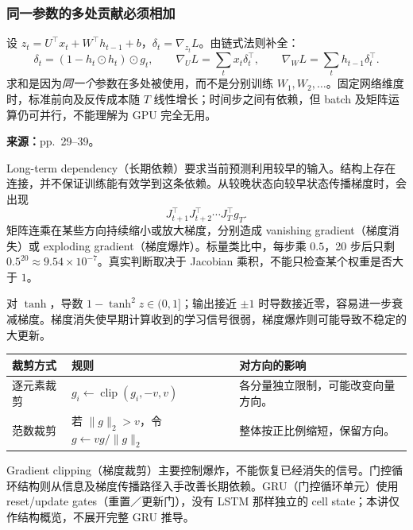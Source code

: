 \subsubsection{同一参数的多处贡献必须相加}

设 $z_t=U^\top x_t+W^\top h_{t-1}+b$，$\delta_t=\nabla_{z_t}L$。由链式法则补全：
\[
 \delta_t=(1-h_t\odot h_t)\odot g_t,\qquad
 \nabla_U L=\sum_t x_t\delta_t^\top,\qquad
 \nabla_W L=\sum_t h_{t-1}\delta_t^\top.
\]
求和是因为\emph{同一个}参数在多处被使用，而不是分别训练 $W_1,W_2,\ldots$。固定网络维度时，标准前向及反传成本随 $T$ 线性增长；时间步之间有依赖，但 batch 及矩阵运算仍可并行，不能理解为 GPU 完全无用。


\textbf{来源：}pp.~29--39。

Long-term dependency（长期依赖）要求当前预测利用较早的输入。结构上存在连接，并不保证训练能有效学到这条依赖。从较晚状态向较早状态传播梯度时，会出现
\[
 J_{t+1}^\top J_{t+2}^\top\cdots J_T^\top g_T.
\]
矩阵连乘在某些方向持续缩小或放大梯度，分别造成 vanishing gradient（梯度消失）或 exploding gradient（梯度爆炸）。标量类比中，每步乘 $0.5$，20 步后只剩 $0.5^{20}\approx9.54\times10^{-7}$。真实判断取决于 Jacobian 乘积，不能只检查某个权重是否大于 $1$。

对 $\tanh$，导数 $1-\tanh^2z\in(0,1]$；输出接近 $\pm1$ 时导数接近零，容易进一步衰减梯度。梯度消失使早期计算收到的学习信号很弱，梯度爆炸则可能导致不稳定的大更新。

\begin{center}
\small
\begin{tabularx}{\textwidth}{@{}lXX@{}}
\toprule
裁剪方式 & 规则 & 对方向的影响 \\
\midrule
逐元素裁剪 & $g_i\leftarrow\operatorname{clip}(g_i,-v,v)$ & 各分量独立限制，可能改变向量方向。 \\
范数裁剪 & 若 $\|g\|_2>v$，令 $g\leftarrow vg/\|g\|_2$ & 整体按正比例缩短，保留方向。 \\
\bottomrule
\end{tabularx}
\end{center}

Gradient clipping（梯度裁剪）主要控制爆炸，不能恢复已经消失的信号。门控循环结构则从信息及梯度传播路径入手改善长期依赖。GRU（门控循环单元）使用 reset/update gates（重置／更新门），没有 LSTM 那样独立的 cell state；本讲仅作结构概览，不展开完整 GRU 推导。


